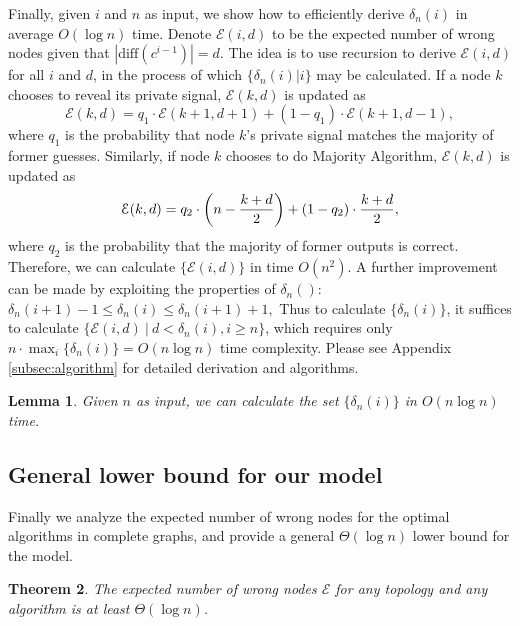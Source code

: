 \documentclass[a4paper,UKenglish]{lipics}
\newtheorem{thm}{Theorem}[section] %
\newtheorem{lem}[thm]{Lemma}
\theoremstyle{definition}
\newcommand{\diff}{\text{diff}}
\begin{document}
Finally, given $i$ and $n$ as input, we show how to efficiently derive $\delta_n(i)$ in average $O(\log n)$ time. 
Denote $\mathcal{E}(i,d)$ to be the expected number of wrong nodes given that $|\diff(c^{i-1})| = d$. 
The idea is to use recursion to derive $\mathcal{E}(i,d)$ for all $i$ and $d$, in the process of which $\{\delta_n(i)|i\}$ may be calculated.
If a node $k$ chooses to reveal its private signal, $\mathcal{E}(k, d)$ is updated as
\begin{equation*}
	\mathcal{E}(k,d) 
= 
 	q_1\cdot \mathcal{E}(k+1, d+1) + (1-q_1)\cdot \mathcal{E}(k+1, d-1),
\end{equation*}
where $q_1$ is the probability that node $k$'s private signal matches the majority of former guesses.
Similarly, if node $k$ chooses to do Majority Algorithm, $\mathcal{E}(k, d)$ is updated as
\begin{equation*}
	\mathcal{E}(k,d) 
= 
	q_2\cdot \left(n - {k+d\over 2}\right) + (1-q_2)\cdot {k+d\over 2},
\end{equation*}
where $q_2$ is the probability that the majority of former outputs is correct.
Therefore, we can calculate $\{\mathcal{E}(i,d)\}$ in time $O(n^2)$.
A further improvement can be made by exploiting the properties of $\delta_n()$:
$
\delta_n(i+1)-1\le \delta_n(i)\le \delta_n(i+1)+1,
$
Thus to calculate $\{\delta_n(i)\}$, it suffices to calculate $\{\mathcal{E}(i,d)~|~d < \delta_n(i), i \ge n\}$,
	which requires only $n\cdot \max_{i}\{\delta_n(i)\} =O( n\log n)$ time complexity.
Please see Appendix \ref{subsec:algorithm} for detailed derivation and algorithms.

\begin{lem}
Given $n$ as input, we can calculate the set $\{\delta_n(i)\}$ in $O(n\log n)$ time.
\end{lem}


\subsection{General lower bound for our model}
Finally we analyze the expected number of wrong nodes for the optimal algorithms in complete graphs, 
	and provide a general $\Theta(\log n)$ lower bound for the model.
	
\begin{thm}
\label{thm:general lower bound}
The expected number of wrong nodes $\mathcal{E}$ for any topology and any algorithm is at least $\Theta(\log n)$.
\end{thm}
\end{document}

